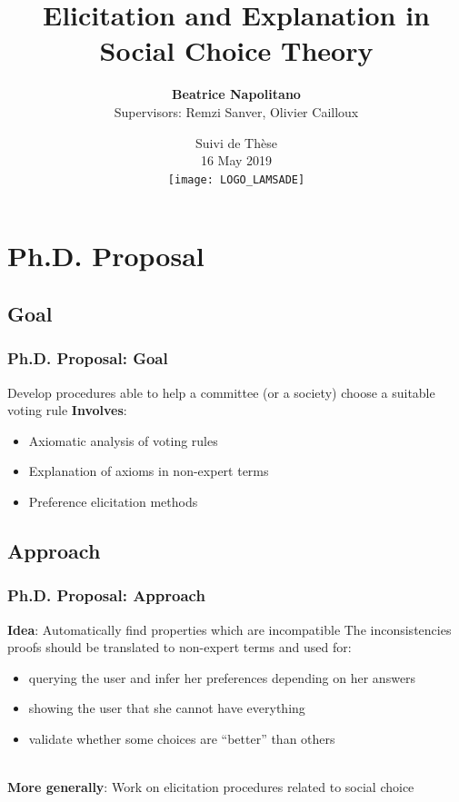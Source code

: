 \documentclass{beamer}
\title[Elicitation and Explanation in Social Choice]{Elicitation and Explanation in Social Choice Theory}
\author[Beatrice Napolitano]{\textbf{Beatrice Napolitano} \\
	Supervisors: Remzi Sanver, Olivier Cailloux}
\date[CST 16 May 2019]{Suivi de Thèse \\ 16 May 2019 \\ \texttt{[image: LOGO\_LAMSADE]} }
\begin{document}
\beamertemplatenavigationsymbolsempty

\begin{frame}[plain]
\maketitle
\end{frame}

\addtocounter{framenumber}{-1}


\section{Ph.D. Proposal}
\subsection*{Goal}
\begin{frame}
\frametitle{\textbf{Ph.D. Proposal:} Goal}
Develop procedures able to help a committee (or a society) choose a suitable voting rule
\newline \newline \textbf{Involves}:
\begin{itemize}
	\item Axiomatic analysis of voting rules
	\item Explanation of axioms in non-expert terms
	\item Preference elicitation methods
\end{itemize}
\end{frame}

\subsection*{Approach}
\begin{frame}
	\frametitle{\textbf{Ph.D. Proposal:} Approach}
	\textbf{Idea}: Automatically find properties which are incompatible  \newline \newline
	The inconsistencies proofs should be translated to non-expert terms and used for:
	\begin{itemize}
		\item querying the user and infer her preferences depending on her answers
		\item showing the user that she cannot have everything
		\item validate whether some choices are ``better'' than others
	\end{itemize}~\\	
	\textbf{More generally}: Work on elicitation procedures related to social choice
\end{frame}
\end{document}
